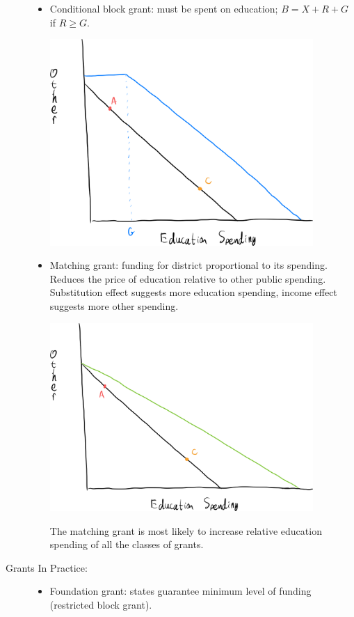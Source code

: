 \documentclass[10pt]{extarticle}
\begin{document}
\begin{description}
\begin{itemize}
        \item Conditional block grant: must be spent on education; $B = X + R + G$ if $R \geq G$.
          \begin{center}
            \includegraphics[width=10cm]{images/restricted_block_grant.png}
          \end{center}
        \item Matching grant: funding for district proportional to its spending. Reduces the price of education relative to other public spending. Substitution effect suggests more education spending, income effect suggests more other spending.
          \begin{center}
            \includegraphics[width=10cm]{images/matching_grant.png}
          \end{center}
          The matching grant is most likely to increase relative education spending of all the classes of grants.
      \end{itemize}
      \item[Grants In Practice:]\hfill
        \begin{itemize}
          \item Foundation grant: states guarantee minimum level of funding (restricted block grant).

\end{itemize}
\end{description}
\end{document}
